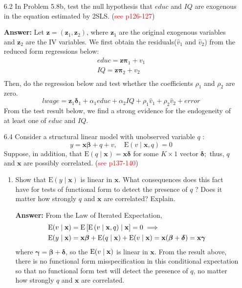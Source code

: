 \begin{enumerate}
    \item[6.2] In Problem 5.8b, test the null hypothesis that $educ$ and $IQ$ are exogenous in the equation estimated by 2SLS. (\textcolor{red}{see p126-127})
    
    \textbf{Answer:} Let $\mathbf{z}=(\mathbf{z}_1,\mathbf{z}_2)$, where $\mathbf{z}_1$ are the original exogenous variables and $\mathbf{z}_2$ are the IV variables. We first obtain the residuals($\hat{v}_1$ and $\hat{v}_2$) from the reduced form regressions below:
    \begin{align*}
        educ = \mathbf{z}\bm{\pi}_1 + v_1 \\ 
        IQ = \mathbf{z}\bm{\pi}_2 + v_2 \\ 
    \end{align*}
    Then, do the regression below and test whether the coefficients $\rho_1$ and $\rho_2$ are zero.
    \[ lwage = \mathbf{z}_1\bm{\delta}_1 + \alpha_1 educ + \alpha_2 IQ + \rho_1\hat{v}_1 + \rho_2\hat{v}_2 + error \]
    From the test result below, we find a strong evidence for the endogeneity of at least one of $educ$ and $IQ$. 
    
    
    \item[6.4] Consider a structural linear model with unobserved variable $q$ :
    \[ y=\mathbf{x} \boldsymbol{\beta}+q+v, \quad \mathrm{E}(v \mid \mathbf{x}, q)=0 \]
    Suppose, in addition, that $\mathrm{E}(q \mid \mathbf{x})=\mathbf{x} \boldsymbol{\delta}$ for some $K \times 1$ vector $\boldsymbol{\delta} ;$ thus, $q$ and $\mathbf{x}$ are possibly correlated. (\textcolor{red}{see p137-140})
    \begin{enumerate}
        \item Show that $\mathrm{E}(y \mid \mathbf{x})$ is linear in $\mathbf{x}$. What consequences does this fact have for tests of functional form to detect the presence of $q$ ? Does it matter how strongly $q$ and $\mathbf{x}$ are correlated? Explain.
        
        \textbf{Answer:} From the Law of Iterated Expectation,
        \begin{align*}
            \mathrm{E}(v\mid\mathbf{x}) &= \mathrm{E}\left[ \mathrm{E}\left( v\mid\mathbf{x},q \right)\mid\mathbf{x} \right] = 0 \implies \\
            \mathrm{E}(y\mid\mathbf{x}) &= \mathbf{x} \boldsymbol{\beta} + \mathrm{E}(q\mid\mathbf{x}) + \mathrm{E}(v\mid\mathbf{x}) = \mathbf{x}(\bm{\beta}+\bm{\delta}) = \mathbf{x}\bm{\gamma}
        \end{align*}
        where $\bm{\gamma} = \bm{\beta}+\bm{\delta}$, so the $\mathrm{E}(v\mid\mathbf{x})$ is linear in $\mathbf{x}$. From the result above, there is no functional form misspecification in this conditional expectation so that no functional form test will detect the presence of $q$, no matter how strongly $q$ and $\mathbf{x}$ are correlated.
        

\end{enumerate}
\end{enumerate}
